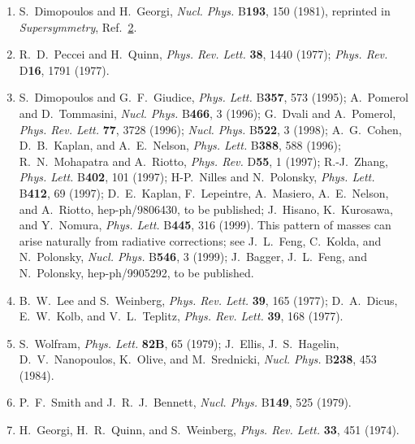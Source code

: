 \begin{enumerate}
  \item {}\label{ch28-ref-3}
  S.~Dimopoulos and H.~Georgi, \textit{Nucl. Phys.} B\textbf{193}, 150
  (1981), reprinted in \textit{Supersymmetry},
  Ref.~\hyperref[ch28-ref-2]{2}.

  \item {}\label{ch28-ref-4}
  R.~D.~Peccei and H.~Quinn, \textit{Phys. Rev. Lett.} \textbf{38},
  1440 (1977); \textit{Phys. Rev.} D\textbf{16}, 1791 (1977).

  \item[4a.] \label{ch28-ref-4a}
  S.~Dimopoulos and G.~F.~Giudice, \textit{Phys. Lett.} B\textbf{357},
  573 (1995); A.~Pomerol and D.~Tommasini, \textit{Nucl. Phys.}
  B\textbf{466}, 3 (1996); G.~Dvali and A.~Pomerol,
  \textit{Phys. Rev. Lett.} \textbf{77}, 3728 (1996);
  \textit{Nucl. Phys.} B\textbf{522}, 3 (1998); A.~G.~Cohen,
  D.~B.~Kaplan, and A.~E.~Nelson, \textit{Phys. Lett.} B\textbf{388},
  588 (1996); R.~N.~Mohapatra and A.~Riotto, \textit{Phys. Rev.}
  D\textbf{55}, 1 (1997); R.-J.~Zhang, \textit{Phys. Lett.}
  B\textbf{402}, 101 (1997); H-P.~Nilles and N.~Polonsky,
  \textit{Phys. Lett.} B\textbf{412}, 69 (1997); D.~E.~Kaplan,
  F.~Lepeintre, A.~Masiero, A.~E.~Nelson, and A.~Riotto,
  hep-ph/9806430, to be published; J.~Hisano, K.~Kurosawa, and
  Y.~Nomura, \textit{Phys. Lett.} B\textbf{445}, 316 (1999). This
  pattern of masses can arise naturally from radiative corrections;
  see J.~L.~Feng, C.~Kolda, and N.~Polonsky, \textit{Nucl. Phys.}
  B\textbf{546}, 3 (1999); J.~Bagger, J.~L.~Feng, and N.~Polonsky,
  hep-ph/9905292, to be published.

  \item[4b.] \label{ch28-ref-4b}
  B.~W.~Lee and S.~Weinberg, \textit{Phys. Rev. Lett.} \textbf{39},
  165 (1977); D.~A.~Dicus, E.~W.~Kolb, and V.~L.~Teplitz,
  \textit{Phys. Rev. Lett.} \textbf{39}, 168 (1977).

  \item[4c.] \label{ch28-ref-4c}
  S.~Wolfram, \textit{Phys. Lett.} \textbf{82B}, 65 (1979); J.~Ellis,
  J.~S.~Hagelin, D.~V.~Nanopoulos, K.~Olive, and M.~Srednicki,
  \textit{Nucl. Phys.} B\textbf{238}, 453 (1984).

  \item[4d.] \label{ch28-ref-4d}
  P.~F.~Smith and J.~R.~J.~Bennett, \textit{Nucl. Phys.} B\textbf{149},
  525 (1979).

  \item {}\label{ch28-ref-5}
  H.~Georgi, H.~R.~Quinn, and S.~Weinberg, \textit{Phys. Rev. Lett.}
  \textbf{33}, 451 (1974).


\end{enumerate}
